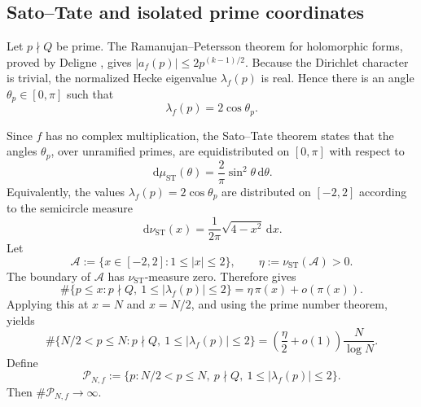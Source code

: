 \documentclass[11pt]{article}
\theoremstyle{definition}
\newcommand{\dd}{\,\mathrm d}
\newcommand{\1}{\mathbf 1}
\begin{document}
\subsection{Sato--Tate and isolated prime coordinates}

Let $p\nmid Q$ be prime.  The Ramanujan--Petersson theorem for holomorphic forms, proved by Deligne \cite{Deligne1974}, gives $|a_f(p)|\le2p^{(k-1)/2}$.  Because the Dirichlet character is trivial, the normalized Hecke eigenvalue $\lambda_f(p)$ is real.  Hence there is an angle $\theta_p\in[0,\pi]$ such that
\begin{equation}\label{eq:ST-param}
\lambda_f(p)=2\cos\theta_p.
\end{equation}

Since $f$ has no complex multiplication, the Sato--Tate theorem \cite[Corollary~7.1.7]{BLGG2011} states that the angles $\theta_p$, over unramified primes, are equidistributed on $[0,\pi]$ with respect to
\begin{equation}\label{eq:ST-measure}
\dd\mu_{\mathrm{ST}}(\theta)
=\frac2\pi\sin^2\theta\dd\theta.
\end{equation}
Equivalently, the values $\lambda_f(p)=2\cos\theta_p$ are distributed on $[-2,2]$ according to the semicircle measure
\begin{equation}\label{eq:ST-semicircle}
\dd\nu_{\mathrm{ST}}(x)
=\frac1{2\pi}\sqrt{4-x^2}\dd x.
\end{equation}
Let
\[
\mathcal A:=\{x\in[-2,2]:1\le|x|\le2\},
\qquad
\eta:=\nu_{\mathrm{ST}}(\mathcal A)>0.
\]
The boundary of $\mathcal A$ has $\nu_{\mathrm{ST}}$-measure zero.  Therefore \cite[Corollary~7.1.7]{BLGG2011} gives
\begin{equation}\label{eq:ST-count-global}
\#\{p\le x:p\nmid Q,\ 1\le|\lambda_f(p)|\le2\}
=\eta\,\pi(x)+o(\pi(x)).
\end{equation}
Applying this at $x=N$ and $x=N/2$, and using the prime number theorem, yields
\begin{equation}\label{eq:ST-count-dyadic}
\#\{N/2<p\le N:p\nmid Q,\ 1\le|\lambda_f(p)|\le2\}
=\left(\frac{\eta}{2}+o(1)\right)\frac{N}{\log N}.
\end{equation}
Define
\begin{equation}\label{eq:modular-PN}
\mathcal P_{N,f}
:=
\{p:N/2<p\le N,\ p\nmid Q,\ 1\le|\lambda_f(p)|\le2\}.
\end{equation}
Then $\#\mathcal P_{N,f}\to\infty$.
\end{document}
